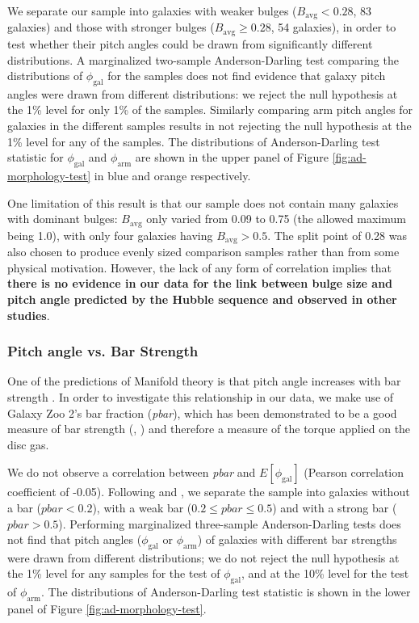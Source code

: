 We separate our sample into galaxies with weaker bulges ($B_\mathrm{avg} < 0.28$, 83 galaxies) and those with stronger bulges ($B_\mathrm{avg} \ge 0.28$, 54 galaxies), in order to test whether their pitch angles could be drawn from significantly different distributions. A marginalized two-sample Anderson-Darling test comparing the distributions of $\phi_\mathrm{gal}$ for the samples does not find evidence that galaxy pitch angles were drawn from different distributions: we reject the null hypothesis at the 1\% level for only 1\% of the samples. Similarly comparing arm pitch angles for galaxies in the different samples results in not rejecting the null hypothesis at the 1\% level for any of the samples. The distributions of Anderson-Darling test statistic for $\phi_\mathrm{gal}$ and $\phi_\mathrm{arm}$ are shown in the upper panel of Figure \ref{fig:ad-morphology-test} in blue and orange respectively.

One limitation of this result is that our sample does not contain many galaxies with dominant bulges: $B_\mathrm{avg}$ only varied from 0.09 to 0.75 (the allowed maximum being 1.0), with only four galaxies having $B_\mathrm{avg} > 0.5$. The split point of 0.28 was also chosen to produce evenly sized comparison samples rather than from some physical motivation. However, the lack of any form of correlation implies that \textbf{there is no evidence in our data for the link between bulge size and pitch angle predicted by the Hubble sequence and observed in other studies}.

\subsubsection{Pitch angle vs. Bar Strength}

One of the predictions of Manifold theory is that pitch angle increases with bar strength \citep{2009MNRAS.400.1706A}. In order to investigate this relationship in our data, we make use of Galaxy Zoo 2's bar fraction (\textit{pbar}), which has been demonstrated to be a good measure of bar strength (\citealt{2012MNRAS.423.1485S}, \citealt{2012MNRAS.424.2180M}) and therefore a measure of the torque applied on the disc gas.

We do not observe a correlation between \textit{pbar} and $E[\phi_\mathrm{gal}]$ (Pearson correlation coefficient of -0.05). Following \citet{2012MNRAS.424.2180M} and \citet{2012MNRAS.423.1485S}, we separate the sample into galaxies without a bar ($\mathrm{\textit{pbar}} < 0.2$), with a weak bar ($0.2 \le \mathrm{\textit{pbar}} \le 0.5$) and with a strong bar ($\mathrm{\textit{pbar}} > 0.5$). Performing marginalized three-sample Anderson-Darling tests does not find that pitch angles ($\phi_\mathrm{gal}$ or $\phi_\mathrm{arm}$) of galaxies with different bar strengths were drawn from different distributions; we do not reject the null hypothesis at the 1\% level for any samples for the test of $\phi_\mathrm{gal}$, and at the 10\% level for the test of $\phi_\mathrm{arm}$. The distributions of Anderson-Darling test statistic is shown in the lower panel of Figure \ref{fig:ad-morphology-test}.

